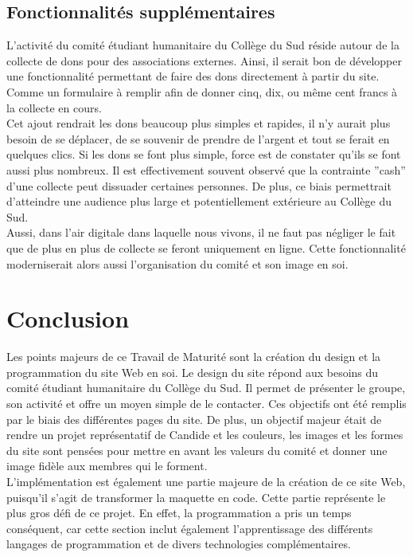 \documentclass[a4,10pt,french]{sphinxmanual}
\begin{document}
\section{Fonctionnalités supplémentaires}
\label{\detokenize{chapitre-03:fonctionnalites-supplementaires}}
\sphinxAtStartPar
L’activité du comité étudiant humanitaire du Collège du Sud réside autour de la collecte de dons pour des associations externes. Ainsi, il serait bon de développer une fonctionnalité permettant de faire des dons directement à partir du site. Comme un formulaire à remplir afin de donner cinq, dix, ou même cent francs à la collecte en cours.\\
Cet ajout rendrait les dons beaucoup plus simples et rapides, il n’y aurait plus besoin de se déplacer, de se souvenir de prendre de l’argent et tout se ferait en quelques clics. Si les dons se font plus simple, force est de constater qu’ils se font aussi plus nombreux. Il est effectivement souvent observé que la contrainte ”cash” d’une collecte peut dissuader certaines personnes. De plus, ce biais permettrait d’atteindre une audience plus large et potentiellement extérieure au Collège du Sud.\\
Aussi, dans l’air digitale dans laquelle nous vivons, il ne faut pas négliger le fait que de plus en plus de collecte se feront uniquement en ligne. Cette fonctionnalité moderniserait alors aussi l’organisation du comité et son image en soi.


\chapter{Conclusion}
\label{\detokenize{chapitre-04:conclusion}}\label{\detokenize{chapitre-04::doc}}
\sphinxAtStartPar
Les points majeurs de ce Travail de Maturité sont la création du design et la programmation du site Web en soi.
Le design du site répond aux besoins du comité étudiant humanitaire du Collège du Sud. Il permet de présenter le groupe, son activité et offre un moyen simple de le contacter. Ces objectifs ont été remplis par le biais des différentes pages du site. De plus, un objectif majeur était de rendre un projet représentatif de Candide et les couleurs, les images et les formes du site sont pensées pour mettre en avant les valeurs du comité et donner une image fidèle aux membres qui le forment.\\
L’implémentation est également une partie majeure de la création de ce site Web, puisqu’il s’agit de transformer la maquette en code. Cette partie représente le plus gros défi de ce projet. En effet, la programmation a pris un temps conséquent, car cette section inclut également l’apprentissage des différents langages de programmation et de divers technologies complémentaires.
\end{document}
